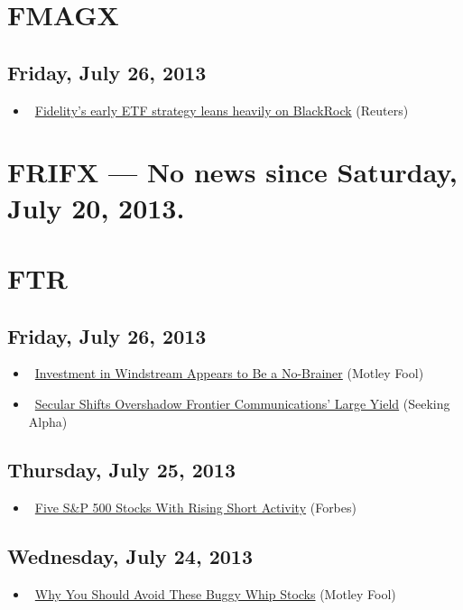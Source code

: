 \documentclass[11pt,asymmetric]{article}
\begin{document}
\section*{FMAGX}

\subsection*{Friday, July 26, 2013}
\begin{itemize}
\item\ \href{http://finance.yahoo.com/news/fidelitys-early-etf-strategy-leans-174409226.html}{Fidelity's early ETF strategy leans heavily on BlackRock} (Reuters)
\end{itemize}

\section*{FRIFX --- No news since Saturday, July 20, 2013.}


\section*{FTR}

\subsection*{Friday, July 26, 2013}
\begin{itemize}
\item\ \href{http://beta.fool.com/alanalder/2013/07/26/investment-in-windstream-appears-to-be-a-no-braine/40849/?source=eogyholnk0000001}{Investment in Windstream Appears to Be a No-Brainer} (Motley Fool)
\item\ \href{http://seekingalpha.com/article/1575462-secular-shifts-overshadow-frontier-communications-large-yield?source=yahoo}{Secular Shifts Overshadow Frontier Communications' Large Yield} (Seeking Alpha)
\end{itemize}
\subsection*{Thursday, July 25, 2013}
\begin{itemize}
\item\ \href{http://www.forbes.com/sites/dividendchannel/2013/07/25/five-sp-500-stocks-with-rising-short-activity-9/?partner=yahootix}{Five S\&P 500 Stocks With Rising Short Activity} (Forbes)
\end{itemize}
\subsection*{Wednesday, July 24, 2013}
\begin{itemize}
\item\ \href{http://beta.fool.com/rciura/2013/07/24/why-you-should-avoid-these-buggy-whip-stocks/41329/?source=eogyholnk0000001}{Why You Should Avoid These Buggy Whip Stocks} (Motley Fool)
\end{itemize}
\end{document}
